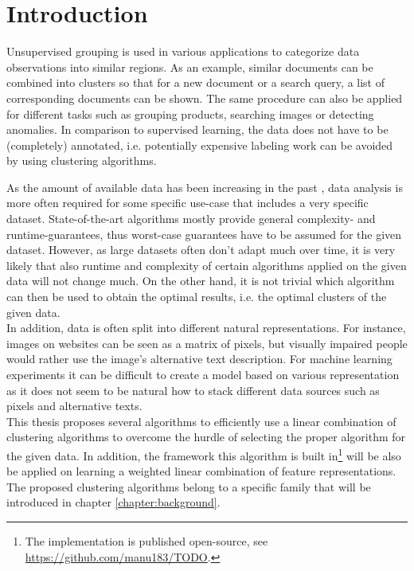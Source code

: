\chapter{Introduction}


Unsupervised grouping is used in various applications to categorize data observations into similar regions. As an example, similar documents can be combined into clusters so that for a new document or a search query, a list of corresponding documents can be shown. The same procedure can also be applied for different tasks such as grouping products, searching images or detecting anomalies. In comparison to supervised learning, the data does not have to be (completely) annotated, i.e. potentially expensive labeling work can be avoided by using clustering algorithms.\\

As the amount of available data has been increasing in the past \cite{wamba2015big}, data analysis is more often required for some specific use-case that includes a very specific dataset. State-of-the-art algorithms mostly provide general complexity- and runtime-guarantees, thus worst-case guarantees have to be assumed for the given dataset. However, as large datasets often don't adapt much over time, it is very likely that also runtime and complexity of certain algorithms applied on the given data will not change much. On the other hand, it is not trivial which algorithm can then be used to obtain the optimal results, i.e. the optimal clusters of the given data.\\

In addition, data is often split into different natural representations. For instance, images on websites can be seen as a matrix of pixels, but visually impaired people would rather use the image's alternative text description. For machine learning experiments it can be difficult to create a model based on various representation as it does not seem to be natural how to stack different data sources such as pixels and alternative texts.\\

This thesis proposes several algorithms to efficiently use a linear combination of clustering algorithms to overcome the hurdle of selecting the proper algorithm for the given data. In addition, the framework this algorithm is built in\footnote{The implementation is published open-source, see \url{https://github.com/manu183/TODO}.} will be also be applied on learning a weighted linear combination of feature representations. The proposed clustering algorithms belong to a specific family that will be introduced in chapter \ref{chapter:background}.